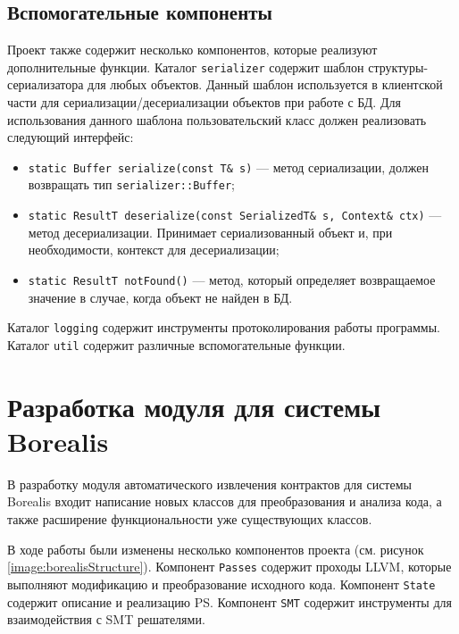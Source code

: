 \subsection{Вспомогательные компоненты}
Проект также содержит несколько компонентов, которые реализуют дополнительные функции. Каталог \texttt{serializer} содержит шаблон структуры-сериализатора для любых объектов. Данный шаблон используется в клиентской части для сериализации/десериализации объектов при работе с БД. Для использования данного шаблона пользовательский класс должен реализовать следующий интерфейс:
\begin{itemize}
\item \texttt{static Buffer serialize(const T\& s)} --- метод сериализации, должен возвращать тип \texttt{serializer::Buffer};
\item \texttt{static ResultT deserialize(const SerializedT\& s, Context\& ctx)} --- метод десериализации. Принимает сериализованный объект и, при необходимости, контекст для десериализации;
\item \texttt{static ResultT notFound()} --- метод, который определяет возвращаемое значение в случае, когда объект не найден в БД.
\end{itemize}

Каталог \texttt{logging} содержит инструменты протоколирования работы программы. Каталог \texttt{util} содержит различные вспомогательные функции.

\section{Разработка модуля для системы Borealis}
В разработку модуля автоматического извлечения контрактов для системы Borealis входит написание новых классов для преобразования и анализа кода, а также расширение функциональности уже существующих классов.

В ходе работы были изменены несколько компонентов проекта (см. рисунок \ref{image:borealisStructure}). Компонент \texttt{Passes} содержит проходы LLVM, которые выполняют модификацию и преобразование исходного кода. Компонент \texttt{State} содержит описание и реализацию PS. Компонент \texttt{SMT} содержит инструменты для взаимодействия с SMT решателями.

